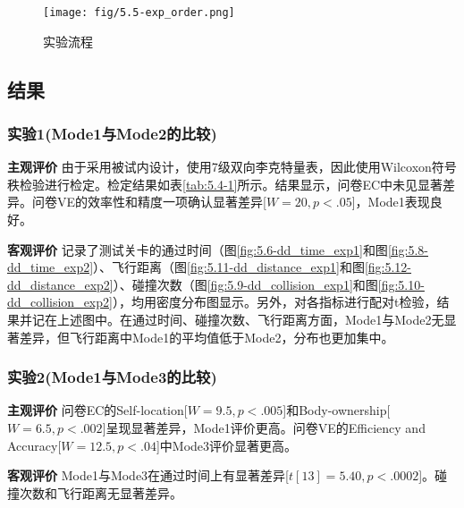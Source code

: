 \begin{figure}[htbp]
    \centering
    \texttt{[image: fig/5.5-exp\_order.png]}
    \caption{实验流程}
    \label{fig:exp_order}
\end{figure}

\subsection{结果}

\subsubsection{实验1(Mode1与Mode2的比较)}
\textbf{主观评价}\quad
由于采用被试内设计，使用7级双向李克特量表，因此使用Wilcoxon符号秩检验进行检定。检定结果如表\ref{tab:5.4-1}所示。结果显示，问卷EC中未见显著差异。问卷VE的效率性和精度一项确认显著差异[$W = 20, p <.05$]，Mode1表现良好。

\textbf{客观评价}\quad
记录了测试关卡的通过时间（图\ref{fig:5.6-dd_time_exp1}和图\ref{fig:5.8-dd_time_exp2}）、飞行距离（图\ref{fig:5.11-dd_distance_exp1}和图\ref{fig:5.12-dd_distance_exp2}）、碰撞次数（图\ref{fig:5.9-dd_collision_exp1}和图\ref{fig:5.10-dd_collision_exp2}），均用密度分布图显示。另外，对各指标进行配对t检验，结果并记在上述图中。在通过时间、碰撞次数、飞行距离方面，Mode1与Mode2无显著差异，但飞行距离中Mode1的平均值低于Mode2，分布也更加集中。

\subsubsection{实验2(Mode1与Mode3的比较)}
\textbf{主观评价}\quad
问卷EC的Self-location[$W = 9.5, p <.005$]和Body-ownership[$W = 6.5, p <.002$]呈现显著差异，Mode1评价更高。问卷VE的Efficiency and Accuracy[$W = 12.5, p <.04$]中Mode3评价显著更高。

\textbf{客观评价}\quad
Mode1与Mode3在通过时间上有显著差异[$t[13]=5.40,p <.0002$]。碰撞次数和飞行距离无显著差异。

